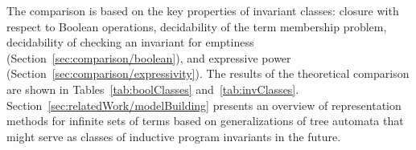 The comparison is based on the key properties of invariant classes: closure with respect to Boolean operations, decidability of the term membership problem, decidability of checking an invariant for emptiness (Section~\cref{sec:comparison/boolean}), and expressive power (Section~\cref{sec:comparison/expressivity}).
The results of the theoretical comparison are shown in Tables~\cref{tab:boolClasses} and~\cref{tab:invClasses}.
Section~\cref{sec:relatedWork/modelBuilding} presents an overview of representation methods for infinite sets of terms based on generalizations of tree automata that might serve as classes of inductive program invariants in the future.


